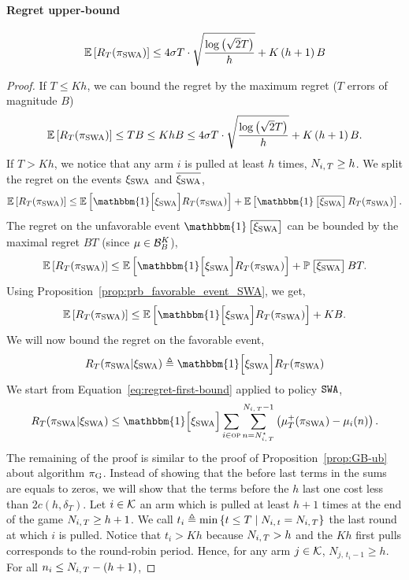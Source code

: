 \paragraph{Regret upper-bound}
%
\begin{proposition}
\label{prop:SWA}
 \[
\mathbb{E}\left[R_T(\pi_{\rm SWA})\right] \leq 4\sigma T\cdot\sqrt{\frac{\log\left(\sqrt{2}T\right)}{h}} + K\left(h+1\right)B
 \]
\end{proposition}
%
\begin{proof}
If $T \leq Kh$, we can bound the regret by the maximum regret ($T$ errors of magnitude $B$)
\[
\mathbb{E}\left[R_T(\pi_{\rm SWA})\right] \leq TB \leq KhB \leq 4\sigma T\cdot\sqrt{\frac{\log\left(\sqrt{2}T\right)}{h}} + K\left(h+1\right)B.
\]
%
If $T > Kh$, we notice that any arm $i$ is pulled at least $h$ times, \ie $N_{i,\,T} \geq h$. We split the regret on the events $\xi_{\rm SWA}$ and $\overline{\xi_{\rm SWA}}$, 
\[
\EE{\regret(\piSWA)} \leq \EE{\mathbbm{1} \Big[\HPSWA\Big] \regret(\piSWA)} + \EE{\mathbbm{1} \left[\bar{\HPSWA}\right] \regret(\piSWA)}.
\]
%
The regret on the unfavorable event $\mathbbm{1} \left[\bar{\HPSWA}\right]$ can be bounded by the maximal regret $BT$ (since $\mu \in \mathcal{B}_{B}^K$), 
\[
\EE{\regret(\piSWA)} \leq  \EE{\mathbbm{1} \Big[\HPSWA\Big] \regret(\piSWA)} + \PP{\bar{\HPSWA}} BT.
\]
%
Using Proposition~\ref{prop:prb_favorable_event_SWA}, we get,
\begin{equation}
\label{eq:regret-unfav-event-SWA}
\EE{\regret(\piSWA)} \leq  \EE{\mathbbm{1} \Big[\HPSWA\Big]  \regret(\piSWA)} + KB.
\end{equation}
%
We will now bound the regret on the favorable event,
\[
\regret(\piSWA | \HPSWA) \triangleq \mathbbm{1} \Big[\HPSWA\Big]  \regret(\piSWA)
\]
%
We start from Equation~\ref{eq:regret-first-bound} applied to policy $\normalfont \texttt{SWA}$,
\begin{equation}
\label{eq:regret-first-bound-SWA}
\regret(\piSWA| \HPSWA) \leq  \mathbbm{1} \Big[\HPSWA\Big] \sum_{i\in \overpullSet}    \sum_{n=\NiT^\star}^{\NiT-1} \pa{\mu^+_T(\piSWA) - \mu_i(n)}.
\end{equation}
%
The remaining of the proof is similar to the proof of Proposition~\ref{prop:GB-ub} about algorithm $\pi_{\rm G}$. Instead of showing that the before last terms in the sums are equals to zeros, we will show that the terms before the $h$ last one cost less than $2c(h, \delta_T)$. Let $i \in \mathcal{K}$ an arm which is pulled at least $h+1$ times at the end of the game $N_{i,\,T} \geq h+1$. We call $t_i \triangleq \min\left\{t\leq T\; |\; N_{i,\,t} = N_{i,\,T}\right\}$ the last round at which $i$ is pulled. Notice that $t_i > Kh$ because $N_{i,\,T} > h$ and the $Kh$ first pulls corresponds to the round-robin period. Hence, for any arm $j \in \mathcal{K}$, $N_{j,\,t_i -1} \geq h$. For all $n_i \leq N_{i,\,T} -(h+1)$, 

\end{proof}
